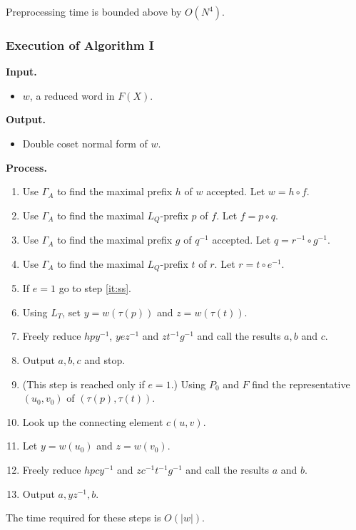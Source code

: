 \documentclass[a4paper,12pt]{article}
\newcommand{\G}{\Gamma }
\renewcommand{\t}{\tau }
\numberwithin{equation}{section}
\numberwithin{figure}{section}
\newcommand{\be}{\begin{enumerate}}
\newcommand{\ee}{\end{enumerate}}
\newcommand{\biz}{\begin{itemize}}
\newcommand{\eiz}{\end{itemize}}
\begin{document}
Preprocessing time is bounded above by $O(N^4)$.
\subsubsection{Execution of Algorithm I}
\noindent\textbf{Input.}
\biz
\item $w$, a reduced word in $F(X)$.
\eiz
\noindent\textbf{Output.}
\biz
\item Double coset normal form of $w$.
\eiz
\noindent\textbf{Process.}
\be
\item Use $\G_A$ to find the maximal prefix $h$ of $w$ accepted.
Let $w=h\circ f$.
\item Use $\G_A$ to find the maximal $L_Q$-prefix $p$ of $f$.
Let $f=p\circ q$.
\item Use $\G_A$ to find the maximal prefix $g$ of $q^{-1}$ accepted.
Let $q=r^{-1}\circ g^{-1}$.
\item Use $\G_A$ to find the maximal $L_Q$-prefix $t$ of $r$.
Let $r=t\circ e^{-1}$.
\item If $e=1$ go to step \ref{it:ss}.
\item Using $L_T$, set $y=w(\t(p))$ and $z=w(\t(t))$.
\item Freely reduce $hpy^{-1}$, $yez^{-1}$ and $zt^{-1}g^{-1}$ and
call the results   $a, b$ and $c$.
\item Output $a,b,c$ and stop.
\item\label{it:ss} (This step is reached only if $e= 1$.)
 Using $P_0$ and $F$ find the representative $(u_0,v_0)$ of $(\t(p),\t(t))$.
\item Look up the connecting element $c(u,v)$.
\item Let $y=w(u_0)$ and $z=w(v_0)$.
\item Freely reduce $hpcy^{-1}$ and $zc^{-1}t^{-1}g^{-1}$ and call the
results $a$ and $b$.
\item Output $a,yz^{-1},b$.
\ee
The time required for these steps is $O(|w|)$.
\end{document}
